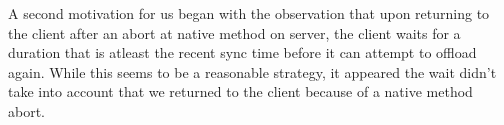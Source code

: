 A second motivation for us began with the observation that upon returning to the client
after an abort at native method on server, the client waits for a duration that is
atleast the recent sync time before it can attempt to offload again. While this
seems to be a reasonable strategy, it appeared the wait didn't take into account
that we returned to the client because of a native method abort.

